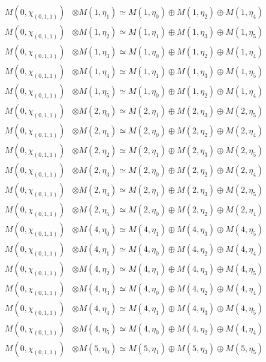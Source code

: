 \begin{align*}
M(0,\chi_{(0,1,1)}) &\otimes M(1,\eta_{1}) \simeq M(1,\eta_{0}) \oplus M(1,\eta_{2}) \oplus M(1,\eta_{4}) \\
M(0,\chi_{(0,1,1)}) &\otimes M(1,\eta_{2}) \simeq M(1,\eta_{1}) \oplus M(1,\eta_{3}) \oplus M(1,\eta_{5}) \\
M(0,\chi_{(0,1,1)}) &\otimes M(1,\eta_{3}) \simeq M(1,\eta_{0}) \oplus M(1,\eta_{2}) \oplus M(1,\eta_{4}) \\
M(0,\chi_{(0,1,1)}) &\otimes M(1,\eta_{4}) \simeq M(1,\eta_{1}) \oplus M(1,\eta_{3}) \oplus M(1,\eta_{5}) \\
M(0,\chi_{(0,1,1)}) &\otimes M(1,\eta_{5}) \simeq M(1,\eta_{0}) \oplus M(1,\eta_{2}) \oplus M(1,\eta_{4}) \\
M(0,\chi_{(0,1,1)}) &\otimes M(2,\eta_{0}) \simeq M(2,\eta_{1}) \oplus M(2,\eta_{3}) \oplus M(2,\eta_{5}) \\
M(0,\chi_{(0,1,1)}) &\otimes M(2,\eta_{1}) \simeq M(2,\eta_{0}) \oplus M(2,\eta_{2}) \oplus M(2,\eta_{4}) \\
M(0,\chi_{(0,1,1)}) &\otimes M(2,\eta_{2}) \simeq M(2,\eta_{1}) \oplus M(2,\eta_{3}) \oplus M(2,\eta_{5}) \\
M(0,\chi_{(0,1,1)}) &\otimes M(2,\eta_{3}) \simeq M(2,\eta_{0}) \oplus M(2,\eta_{2}) \oplus M(2,\eta_{4}) \\
M(0,\chi_{(0,1,1)}) &\otimes M(2,\eta_{4}) \simeq M(2,\eta_{1}) \oplus M(2,\eta_{3}) \oplus M(2,\eta_{5}) \\
M(0,\chi_{(0,1,1)}) &\otimes M(2,\eta_{5}) \simeq M(2,\eta_{0}) \oplus M(2,\eta_{2}) \oplus M(2,\eta_{4}) \\
M(0,\chi_{(0,1,1)}) &\otimes M(4,\eta_{0}) \simeq M(4,\eta_{1}) \oplus M(4,\eta_{3}) \oplus M(4,\eta_{5}) \\
M(0,\chi_{(0,1,1)}) &\otimes M(4,\eta_{1}) \simeq M(4,\eta_{0}) \oplus M(4,\eta_{2}) \oplus M(4,\eta_{4}) \\
M(0,\chi_{(0,1,1)}) &\otimes M(4,\eta_{2}) \simeq M(4,\eta_{1}) \oplus M(4,\eta_{3}) \oplus M(4,\eta_{5}) \\
M(0,\chi_{(0,1,1)}) &\otimes M(4,\eta_{3}) \simeq M(4,\eta_{0}) \oplus M(4,\eta_{2}) \oplus M(4,\eta_{4}) \\
M(0,\chi_{(0,1,1)}) &\otimes M(4,\eta_{4}) \simeq M(4,\eta_{1}) \oplus M(4,\eta_{3}) \oplus M(4,\eta_{5}) \\
M(0,\chi_{(0,1,1)}) &\otimes M(4,\eta_{5}) \simeq M(4,\eta_{0}) \oplus M(4,\eta_{2}) \oplus M(4,\eta_{4}) \\
M(0,\chi_{(0,1,1)}) &\otimes M(5,\eta_{0}) \simeq M(5,\eta_{1}) \oplus M(5,\eta_{3}) \oplus M(5,\eta_{5}) \\

\end{align*}

